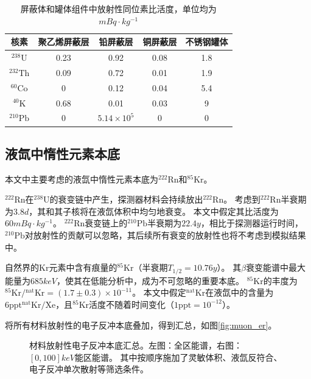 \begin{table}
  \centering
  \caption{屏蔽体和罐体组件中放射性同位素比活度，单位均为$\si{mBq\cdot kg^{-1}}$}
  \begin{tabular}{ccccc}
    \toprule
    核素 & 聚乙烯屏蔽层 & 铅屏蔽层 & 铜屏蔽层 & 不锈钢罐体 \\
    \midrule
    ${}^{238}\mathrm{U}$ & 0.23 & 0.92 & 0.08 & 1.8 \\
    ${}^{232}\mathrm{Th}$ & 0.09 & 0.72 & 0.01 & 1.9 \\
    ${}^{60}\mathrm{Co}$ & 0 & 0.12 & 0.04 & 5.4 \\
    ${}^{40}\mathrm{K}$ & 0.68 & 0.01 & 0.03 & 9 \\
    ${}^{210}\mathrm{Pb}$ & 0 & $5.14\times10^5$ & 0 & 0 \\
    \bottomrule
  \end{tabular}
  \label{tab:shield_radio}
\end{table}

\subsection{液氙中惰性元素本底}

本文中主要考虑的液氙中惰性元素本底为${}^{222}\mathrm{Rn}$和${}^{85}\mathrm{Kr}$。

${}^{222}\mathrm{Rn}$在${}^{238}\mathrm{U}$的衰变链中产生，探测器材料会持续放出${}^{222}\mathrm{Rn}$。
考虑到${}^{222}\mathrm{Rn}$半衰期为$3.8d$，其和其子核将在液氙体积中均匀地衰变\cite{the_xenon_collaboration_projected_2020}。
本文中假定其比活度为$60\si{mBq\cdot kg^{-1}}$。
${}^{222}\mathrm{Rn}$衰变链上的${}^{210}\mathrm{Pb}$半衰期为$22.4y$，相比于探测器运行时间，
${}^{210}\mathrm{Pb}$对放射性的贡献可以忽略，其后续所有衰变的放射性也将不考虑到模拟结果中。

自然界的$\mathrm{Kr}$元素中含有痕量的${}^{85}\mathrm{Kr}$（半衰期$T_{1/2}=10.76y$）。
其$\beta$衰变能谱中最大能量为$685\si{keV}$，使其在低能分析中，成为不可忽略的重要本底。
${}^{85}\mathrm{Kr}$的丰度为${}^{85}\mathrm{Kr}/{}^\mathrm{nat}\mathrm{Kr}=(1.7\pm0.3)\times 10^{-11}$\cite{the_xenon_collaboration_projected_2020}。
本文中假定${}^\mathrm{nat}\mathrm{Kr}$在液氙中的含量为$6\mathrm{ppt}{}^\mathrm{nat}\mathrm{Kr}/\mathrm{Xe}$，且${}^{85}\mathrm{Kr}$活度不随着时间变化（$1\mathrm{ppt}=10^{-12}$）。

将所有材料放射性的电子反冲本底叠加，得到汇总，如图\ref{fig:muon_er}。

\begin{figure}
  \centering
  
  \caption{\label{fig:material_er} 材料放射性电子反冲本底汇总。左图：全区能谱，右图：$[0, 100]\si{keV}$能区能谱。
  其中按顺序施加了灵敏体积、液氙反符合、电子反冲单次散射等筛选条件。}
\end{figure}

